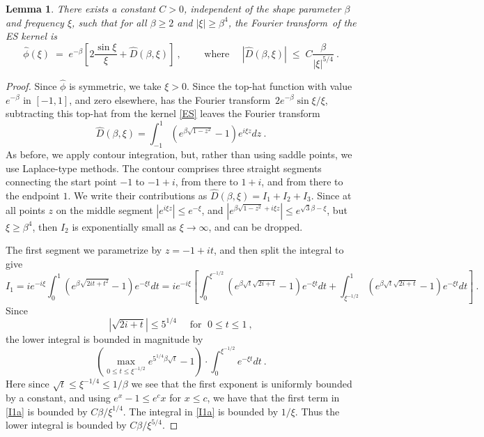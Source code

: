 \documentclass[10pt]{article}
\newcommand{\be}{\begin{equation}}
\newcommand{\ee}{\end{equation}}
\newtheorem{lem}[thm]{Lemma}
\newcommand{\freq}{\beta}          %
\newcommand{\FT}{Fourier transform}
\begin{document}
\begin{lem} %
  There exists a constant $C>0$, independent
  of the shape parameter $\freq$ and frequency $\xi$, such that for all
  $\freq \ge 2$ and $|\xi|\ge\freq^4$,
  the \FT\ of the ES kernel is
  \be
  \hat\phi(\xi) \;=\; e^{-\beta}\left[ 2\frac{\sin \xi}{\xi}
    + \hat D(\freq,\xi) \right]
  ~,\qquad \mbox{ where } \quad  |\hat D(\freq,\xi)| \; \le \;
  C \frac{\freq}{|\xi|^{5/4}}
  ~.
  \label{EShat3}
  \ee
  \label{l:EShat3}
\end{lem}
\begin{proof}
  Since $\hat\phi$ is symmetric, we take $\xi>0$.
  Since the top-hat function with value $e^{-\freq}$ in $[-1,1]$, and zero
  elsewhere, has the \FT\ $2e^{-\beta} \sin \xi / \xi$,
  subtracting this top-hat from the kernel \eqref{ES} leaves the \FT\
  $$
  \hat D(\freq,\xi) = \int_{-1}^1 (e^{\freq \sqrt{1-z^2}} - 1) e^{i\xi z} dz~.
  $$
  As before, we apply contour integration,
  but, rather than using saddle points, we use Laplace-type methods.
  The contour comprises three straight segments connecting the start
  point $-1$ to $-1+i$, from there to $1+i$, and from there to the endpoint $1$.
  We write their contributions as $\hat D(\freq,\xi) = I_1+I_2+I_3$.
  Since at all points $z$ on the middle segment
  $|e^{i\xi z}|\le e^{-\xi}$, and 
  $|e^{\freq \sqrt{1-z^2} +i\xi z}| \le e^{\sqrt{3} \freq - \xi}$, 
  but $\xi\ge \freq^4$,
  then $I_2$ is exponentially small as $\xi\to\infty$,
  and can be dropped.
  
  The first segment we parametrize by $z=-1+it$, and then split the integral
  to give
  $$
  I_1 = i e^{-i\xi} \int_{0}^1 (e^{\freq \sqrt{2it + t^2}} - 1)e^{-\xi t} dt
  = i e^{-i\xi} \left[ \int_{0}^{\xi^{-1/2}} (e^{\freq \sqrt{t} \sqrt{2i + t}} - 1)e^{-\xi t} dt
    + \int_{\xi^{-1/2}}^1 (e^{\freq \sqrt{t} \sqrt{2i + t}} - 1)e^{-\xi t}  dt \right]
  ~.
$$
  Since
  \be
  |\sqrt{2i+t}|\le 5^{1/4} \quad  \mbox{ for } \; 0\le t\le1 ~,
  \label{5q}
  \ee
  the lower integral is bounded in magnitude by
  \be
  \left(\max_{0\le t \le \xi^{-1/2}} e^{5^{1/4}\freq \sqrt{t}} - 1 \right) \cdot
  \int_{0}^{\xi^{-1/2}} e^{-\xi t} dt~.
  \label{I1a}
  \ee
  Here since $\sqrt{t}\le \xi^{-1/4} \le 1/\freq$ we see that the first exponent
  is uniformly bounded by a constant, and using $e^x-1 \le e^c x$ for $x\le c$,
  we have that the first term in \eqref{I1a} is bounded by $C\freq/\xi^{1/4}$.
  The integral in \eqref{I1a} is bounded by $1/\xi$.
  Thus the lower integral is bounded by $C\freq/\xi^{5/4}$.


\end{proof}
\end{document}
